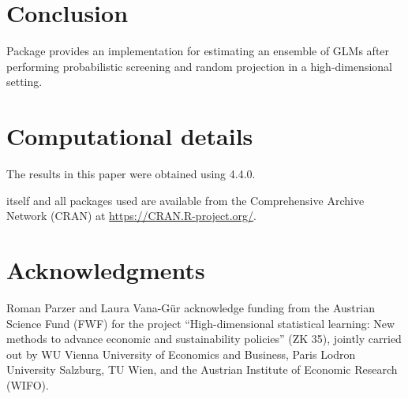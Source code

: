 \documentclass[
  article]{jss}
\begin{document}
\section{Conclusion}\label{sec-conclusion}

Package  provides an implementation for estimating an ensemble
of GLMs after performing probabilistic screening and random projection
in a high-dimensional setting.

\section*{Computational details}\label{computational-details}

The results in this paper were obtained using  4.4.0.

 itself and all packages used are available from the
Comprehensive  Archive Network (CRAN) at
\url{https://CRAN.R-project.org/}.

\section*{Acknowledgments}\label{acknowledgments}

Roman Parzer and Laura Vana-Gür acknowledge funding from the Austrian
Science Fund (FWF) for the project ``High-dimensional statistical
learning: New methods to advance economic and sustainability policies''
(ZK 35), jointly carried out by WU Vienna University of Economics and
Business, Paris Lodron University Salzburg, TU Wien, and the Austrian
Institute of Economic Research (WIFO).


\renewcommand\refname{References}
  
\end{document}
